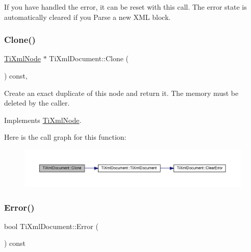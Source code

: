 If you have handled the error, it can be reset with this call. The error state is automatically cleared if you Parse a new X\+ML block. \mbox{\label{classTiXmlDocument_a46a4dda6c56eb106d46d4046ae1e5353}} 
\subsubsection{\texorpdfstring{Clone()}{Clone()}}
{\footnotesize\ttfamily \hyperlink{classTiXmlNode}{Ti\+Xml\+Node} $\ast$ Ti\+Xml\+Document\+::\+Clone (\begin{DoxyParamCaption}{ }\end{DoxyParamCaption}) const\hspace{0.3cm}{\ttfamily [protected]}, {\ttfamily [virtual]}}

Create an exact duplicate of this node and return it. The memory must be deleted by the caller. 

Implements \hyperlink{classTiXmlNode_a4508cc3a2d7a98e96a54cc09c37a78a4}{Ti\+Xml\+Node}.

Here is the call graph for this function\+:
\nopagebreak
\begin{figure}[H]
\begin{center}
\leavevmode
\includegraphics[width=350pt]{classTiXmlDocument_a46a4dda6c56eb106d46d4046ae1e5353_cgraph}
\end{center}
\end{figure}
\mbox{\label{classTiXmlDocument_a348e68faad4a3498f413c51ee9bc321a}} 
\subsubsection{\texorpdfstring{Error()}{Error()}}
{\footnotesize\ttfamily bool Ti\+Xml\+Document\+::\+Error (\begin{DoxyParamCaption}{ }\end{DoxyParamCaption}) const\hspace{0.3cm}{\ttfamily [inline]}}

